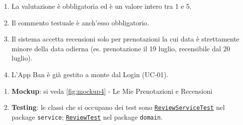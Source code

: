 {
	\begin{enumerate}[nosep, leftmargin=*]
		\item[•] La valutazione è obbligatoria ed è un valore intero tra 1 e 5.
		\item[•] Il commento testuale è anch'esso obbligatorio.
		\item[•] Il sistema accetta recensioni solo per prenotazioni la cui data è strettamente minore della data odierna (es. prenotazione il 19 luglio, recensibile dal 20 luglio).
		\item[•] L'App Ban è già gestito a monte dal Login (UC-01).
	\end{enumerate}
	
	\begin{enumerate}[leftmargin=*]
		\item[•] \textbf{Mockup}: si veda \autoref{fig:mockup4} - Le Mie Prenotazioni e Recensioni
		
		\item[•] \textbf{Testing}: le classi che si occupano dei test sono \hyperref[itm:application_moderation]{\texttt{ReviewServiceTest}} nel package \texttt{service}; \hyperref[itm:domain_moderation]{\texttt{ReviewTest}} nel package \texttt{domain}.
	\end{enumerate}
}